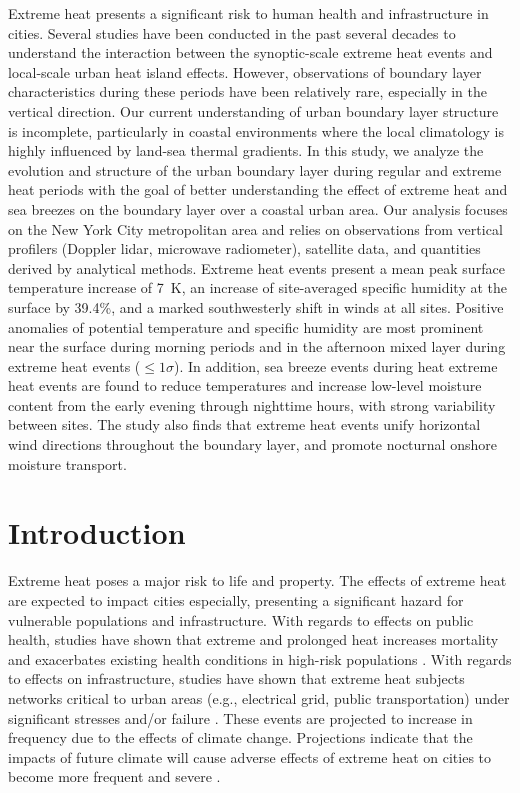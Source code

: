 \documentclass[11pt,a4paper]{article}
\begin{document}
Extreme heat presents a significant risk to human health and infrastructure in cities. Several studies have been conducted in the past several decades to understand the interaction between the synoptic-scale extreme heat events and local-scale urban heat island effects. However, observations of boundary layer characteristics during these periods have been relatively rare, especially in the vertical direction. Our current understanding of urban boundary layer structure is incomplete, particularly in coastal environments where the local climatology is highly influenced by land-sea thermal gradients. In this study, we analyze the evolution and structure of the urban boundary layer during regular and extreme heat periods with the goal of better understanding the effect of extreme heat and sea breezes on the boundary layer over a coastal urban area. Our analysis focuses on the New York City metropolitan area and relies on observations from vertical profilers (Doppler lidar, microwave radiometer), satellite data, and quantities derived by analytical methods. Extreme heat events present a mean peak surface temperature increase of \SI{7}{\kelvin}, an increase of site-averaged specific humidity at the surface by 39.4\%, and a marked southwesterly shift in winds at all sites. Positive anomalies of potential temperature and specific humidity are most prominent near the surface   during morning periods and in the afternoon mixed layer during extreme heat events ($\leq 1\sigma$). In addition, sea breeze events during heat extreme heat events are found to reduce temperatures and increase low-level moisture content from the early evening through nighttime hours, with strong variability between sites. The study also finds that extreme heat events unify horizontal wind directions throughout the boundary layer, and promote nocturnal onshore moisture transport. 

\section{Introduction} \label{section:introduction}

Extreme heat poses a major risk to life and property. The effects of extreme heat are expected to impact cities especially, presenting a significant hazard for vulnerable populations and infrastructure. With regards to effects on public health, studies have shown that extreme and prolonged heat increases mortality and exacerbates existing health conditions in high-risk populations \citep{anderson2011, frumkin2016, heaviside2017, madrigano2015}. With regards to effects on infrastructure, studies have shown that extreme heat subjects networks critical to urban areas (e.g., electrical grid, public transportation) under significant stresses and/or failure \citep{mcevoy2012, zuo2015}. These events are projected to increase in frequency due to the effects of climate change. Projections indicate that the impacts of future climate will cause adverse effects of extreme heat on cities to become more frequent and severe \citep{burillo2019, forzieri2018, peng2011}.
\end{document}
